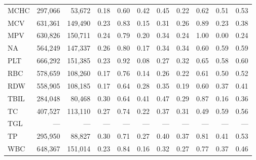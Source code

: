 \begin{table}[ht]
\begin{tabular}{lrrrrrrrrrr}
MCHC & 297,066 & 53,672 & 0.18 & 0.60 & 0.42 & 0.45 & 0.22 & 0.62 & 0.51 & 0.53 \\
MCV & 631,361 & 149,490 & 0.23 & 0.83 & 0.15 & 0.31 & 0.26 & 0.89 & 0.23 & 0.38 \\
MPV & 630,826 & 150,711 & 0.24 & 0.79 & 0.20 & 0.34 & 0.24 & 1.00 & 0.00 & 0.24 \\
NA & 564,249 & 147,337 & 0.26 & 0.80 & 0.17 & 0.34 & 0.34 & 0.60 & 0.59 & 0.59 \\
PLT & 666,292 & 151,385 & 0.23 & 0.92 & 0.08 & 0.27 & 0.32 & 0.65 & 0.58 & 0.60 \\
RBC & 578,659 & 108,260 & 0.17 & 0.76 & 0.14 & 0.26 & 0.22 & 0.61 & 0.50 & 0.52 \\
RDW & 558,905 & 108,185 & 0.17 & 0.64 & 0.28 & 0.35 & 0.19 & 0.60 & 0.37 & 0.41 \\
TBIL & 284,048 & 80,468 & 0.30 & 0.64 & 0.41 & 0.47 & 0.29 & 0.87 & 0.16 & 0.36 \\
TC & 407,527 & 113,110 & 0.27 & 0.74 & 0.22 & 0.37 & 0.31 & 0.49 & 0.59 & 0.56 \\
TGL & --- & --- & --- & --- & --- & --- & --- & --- & --- & --- \\
TP & 295,950 & 88,827 & 0.30 & 0.71 & 0.27 & 0.40 & 0.37 & 0.81 & 0.41 & 0.53 \\
WBC & 648,367 & 151,014 & 0.23 & 0.84 & 0.16 & 0.32 & 0.27 & 0.77 & 0.37 & 0.46 \\
\bottomrule
\end{tabular}
\label{tab:chs_eval_mortality}
\end{table}